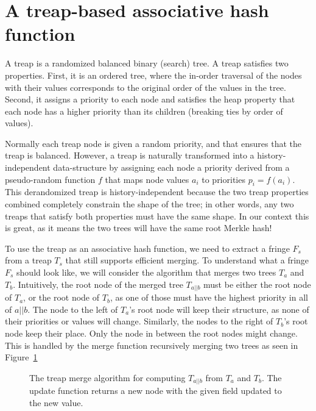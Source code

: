 \section{A treap-based associative hash function}
\label{s:treap}

A treap is a randomized balanced binary (search) tree. A treap satisfies two
properties.  First, it is an ordered tree, where the in-order traversal of the
nodes with their values corresponds to the original order of the values in the
tree. Second, it assigns a priority to each node and satisfies the heap
property that each node has a higher priority than its children (breaking ties
by order of values).

Normally each treap node is given a random priority, and that ensures that the
treap is balanced. However, a treap is naturally transformed into a
history-independent data-structure by assigning each node a priority derived
from a pseudo-random function $f$ that maps node values $a_i$ to priorities
$p_i = f(a_i)$. This derandomized treap is history-independent because the two
treap properties combined completely constrain the shape of the tree; in other
words, any two treaps that satisfy both properties must have the same shape. In
our context this is great, as it means the two trees will have the same root
Merkle hash!

To use the treap as an associative hash function, we need to extract a fringe $F_s$
from a treap $T_s$ that still supports efficient merging. To understand what a
fringe $F_s$ should look like, we will consider the algorithm that merges two
trees $T_a$ and $T_b$. Intuitively, the root node of the merged tree $T_{a||b}$
must be either the root node of $T_a$, or the root node of $T_b$, as one of those
must have the highest priority in all of $a||b$. The node to the left of $T_a$'s
root node will keep their structure, as none of their priorities or values will change.
Similarly, the nodes to the right of $T_b$'s root node keep their place. Only
the node in between the root nodes might change. This is handled by the merge function
recursively merging two trees as seen in Figure~\ref{fig:treap-merge}

\begin{figure}

\caption{The treap merge algorithm for computing $T_{a||b}$ from $T_a$ and $T_b$. The update function returns a new node with the given field updated to the new value.}
\label{fig:treap-merge}
\end{figure}

